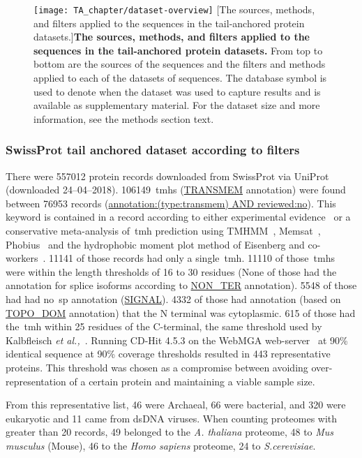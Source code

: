 \begin{figure}[!ht]
\centering
\texttt{[image: TA\_chapter/dataset-overview]}
        [The sources, methods, and filters applied to the sequences in the tail\--anchored protein datasets.]{\textbf{The sources, methods, and filters applied to the sequences in the tail\--anchored protein datasets.}
        From top to bottom are the sources of the sequences and the filters and methods applied to each of the datasets of sequences. The database symbol is used to denote when the dataset was used to capture results and is available as supplementary material. For the dataset size and more information, see the methods section text.
}

\label{fig:dataset-overview}
\end{figure}

\subsubsection{SwissProt tail anchored dataset according to filters}
There were 557012 protein records downloaded from SwissProt via UniProt~\cite{TheUniProtConsortium2014} (downloaded 24--04--2018).
106149~\gls{tmh}s (\url{TRANSMEM} annotation) were found between 76953 records (\url{annotation:(type:transmem) AND reviewed:no}).
This keyword is contained in a record according to either experimental evidence~\cite{TheUniProtConsortium2014} or a conservative meta-analysis of~\gls{tmh} prediction using TMHMM~\cite{Krogh2001}, Memsat~\cite{Jones2007}, Phobius~\cite{Kall2004,Kall2007} and the hydrophobic moment plot method of Eisenberg and co-workers~\cite{Eisenberg1984}.
11141 of those records had only a single~\gls{tmh}.
11110 of those~\gls{tmh}s were within the length thresholds of 16 to 30 residues (None of those had the annotation for splice isoforms according to \url{NON_TER} annotation).
5548 of those had had no~\gls{sp} annotation (\url{SIGNAL}).
4332 of those had annotation (based on \url{TOPO_DOM} annotation) that the N terminal was cytoplasmic.
615 of those had the~\gls{tmh} within 25 residues of the C\--terminal, the same threshold used by Kalbfleisch \textit{et al.,}~\cite{Kalbfleisch2007}.
Running CD-Hit 4.5.3 on the WebMGA web-server~\cite{Huang2010, Wu2011} at 90\% identical sequence at 90\% coverage thresholds resulted in 443 representative proteins.
This threshold was chosen as a compromise between avoiding over-representation of a certain protein and maintaining a viable sample size.

From this representative list, 46 were Archaeal, 66 were bacterial, and 320 were eukaryotic and 11 came from dsDNA viruses.
When counting proteomes with greater than 20 records, 49 belonged to the \textit{A. thaliana} proteome, 48 to \textit{Mus musculus} (Mouse), 46 to the \textit{Homo sapiens} proteome, 24 to \textit{S.cerevisiae}. %

